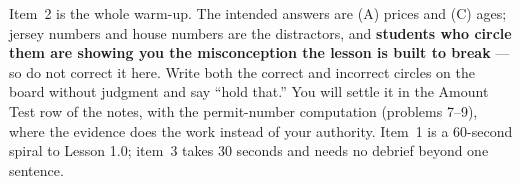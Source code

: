 \documentclass[10pt]{article}
\begin{document}
\begin{teachernote}[Warm-Up]
Item~2 is the whole warm-up. The intended answers are (A) prices and (C) ages; jersey numbers and
house numbers are the distractors, and \textbf{students who circle them are showing you the
misconception the lesson is built to break} --- so do not correct it here. Write both the correct
and incorrect circles on the board without judgment and say ``hold that.'' You will settle it in
the Amount Test row of the notes, with the permit-number computation (problems 7--9), where the
evidence does the work instead of your authority. Item~1 is a 60-second spiral to Lesson 1.0; item~3 takes 30 seconds and needs no
debrief beyond one sentence.
\end{teachernote}
\end{document}
